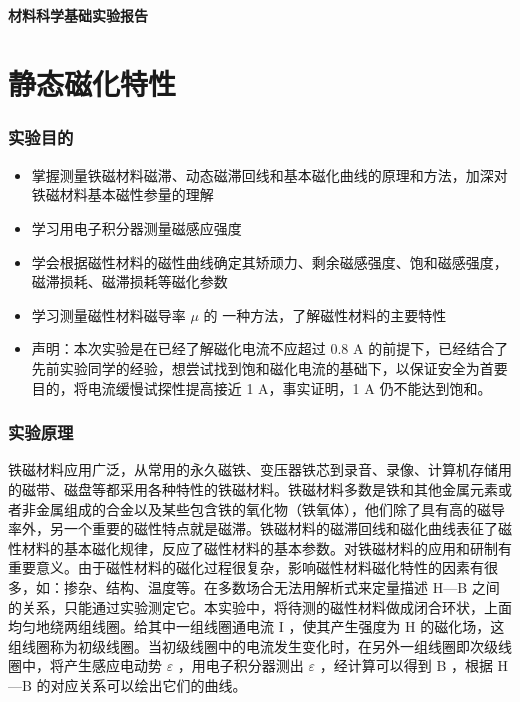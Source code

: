 \documentclass[a4paper,utf8]{article}
\begin{document}
\begin{center}
    {\mbox{}\\[7em]\bfseries\songti%
    材料科学基础实验报告}\\[34mm]
\end{center}\newpage
\part{静态磁化特性}
\section{实验目的}
    \begin{itemize}
        \item 掌握测量铁磁材料磁滞、动态磁滞回线和基本磁化曲线的原理和方法，加深对铁磁材料基本磁性参量的理解 
        \item 学习用电子积分器测量磁感应强度
        \item 学会根据磁性材料的磁性曲线确定其矫顽力、剩余磁感强度、饱和磁感强度，磁滞损耗、磁滞损耗等磁化参数
        \item 学习测量磁性材料磁导率 $\mu$ 的 一种方法，了解磁性材料的主要特性
        \item 声明：本次实验是在已经了解磁化电流不应超过 0.8 A 的前提下，已经结合了先前实验同学的经验，想尝试找到饱和磁化电流的基础下，以保证安全为首要目的，将电流缓慢试探性提高接近 1 A，事实证明，1 A 仍不能达到饱和。
    \end{itemize}
\section{实验原理}%
    铁磁材料应用广泛，从常用的永久磁铁、变压器铁芯到录音、录像、计算机存储用的磁带、磁盘等都采用各种特性的铁磁材料。铁磁材料多数是铁和其他金属元素或者非金属组成的合金以及某些包含铁的氧化物（铁氧体），他们除了具有高的磁导率外，另一个重要的磁性特点就是磁滞。铁磁材料的磁滞回线和磁化曲线表征了磁性材料的基本磁化规律，反应了磁性材料的基本参数。对铁磁材料的应用和研制有重要意义。由于磁性材料的磁化过程很复杂，影响磁性材料磁化特性的因素有很多，如：掺杂、结构、温度等。在多数场合无法用解析式来定量描述 H—B 之间的关系，只能通过实验测定它。本实验中，将待测的磁性材料做成闭合环状，上面均匀地绕两组线圈。给其中一组线圈通电流 I ，使其产生强度为 H 的磁化场，这组线圈称为初级线圈。当初级线圈中的电流发生变化时，在另外一组线圈即次级线圈中，将产生感应电动势 $\varepsilon$ ，用电子积分器测出 $\varepsilon$ ，经计算可以得到 B ，根据 H—B 的对应关系可以绘出它们的曲线。
\end{document}
